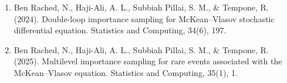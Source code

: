 \begin{talk}
\begin{enumerate}
 \item[{[1]}] Ben Rached, N., Haji-Ali, A. L., Subbiah Pillai, S. M., \& Tempone, R. (2024). Double-loop importance sampling for McKean--Vlasov stochastic differential equation. Statistics and Computing, 34(6), 197.
 \item[{[2]}] Ben Rached, N., Haji-Ali, A. L., Subbiah Pillai, S. M., \& Tempone, R. (2025). Multilevel importance sampling for rare events associated with the McKean--Vlasov equation. Statistics and Computing, 35(1), 1.
\end{enumerate}

\end{talk}
